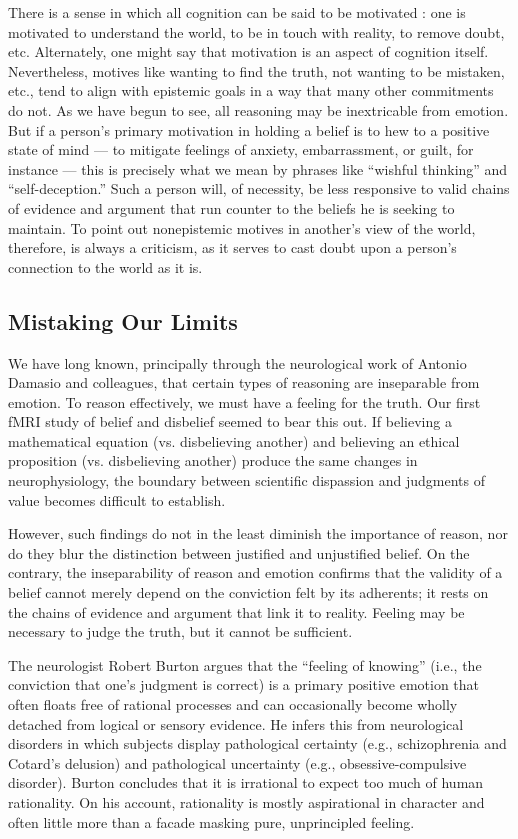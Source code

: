 \documentclass[a4paper,14pt]{extarticle}
\begin{document}
There is a sense in which all cognition can be said to be motivated :
one is motivated to understand the world, to be in touch with reality, to remove doubt, etc.
Alternately, one might say that motivation is an aspect of cognition itself.
Nevertheless, motives like wanting to find the truth, not wanting to be mistaken, etc., tend to align with epistemic goals in a way that many other commitments do not.
As we have begun to see, all reasoning may be inextricable from emotion.
But if a person’s primary motivation in holding a belief is to hew to a positive state of mind --- to mitigate feelings of anxiety, embarrassment, or guilt, for instance --- this is precisely what we mean by phrases like ``wishful thinking'' and ``self-deception.''
Such a person will, of necessity, be less responsive to valid chains of evidence and argument that run counter to the beliefs he is seeking to maintain.
To point out nonepistemic motives in another’s view of the world, therefore, is always a criticism, as it serves to cast doubt upon a person’s connection to the world as it is.

\subsection{Mistaking Our Limits}

We have long known, principally through the neurological work of Antonio Damasio and colleagues, that certain types of reasoning are inseparable from emotion.
To reason effectively, we must have a feeling for the truth.
Our first fMRI study of belief and disbelief seemed to bear this out.
If believing a mathematical equation (vs. disbelieving another) and believing an ethical proposition (vs. disbelieving another) produce the same changes in neurophysiology, the boundary between scientific dispassion and judgments of value becomes difficult to establish.

However, such findings do not in the least diminish the importance of reason, nor do they blur the distinction between justified and unjustified belief.
On the contrary, the inseparability of reason and emotion confirms that the validity of a belief cannot merely depend on the conviction felt by its adherents;
it rests on the chains of evidence and argument that link it to reality.
Feeling may be necessary to judge the truth, but it cannot be sufficient.

The neurologist Robert Burton argues that the ``feeling of knowing'' (i.e., the conviction that one’s judgment is correct) is a primary positive emotion that often floats free of rational processes and can occasionally become wholly detached from logical or sensory evidence.
He infers this from neurological disorders in which subjects display pathological certainty (e.g., schizophrenia and Cotard’s delusion) and pathological uncertainty (e.g., obsessive-compulsive disorder).
Burton concludes that it is irrational to expect too much of human rationality.
On his account, rationality is mostly aspirational in character and often little more than a facade masking pure, unprincipled feeling.
\end{document}
